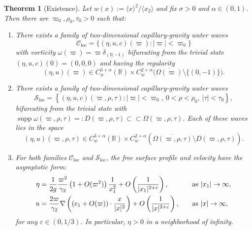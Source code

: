 \documentclass[11pt,reqno]{amsart}
\newcommand{\jbracket}[1]{\langle{#1}\rangle}
\newcommand{\supp}[1]{\operatorname{supp}{#1}}
\newcommand{\R}{\mathbb{R}}
\newcommand{\abs}[2][]{#1\lvert #2 #1\rvert}
\theoremstyle{plain}
\newtheorem{theorem}{Theorem}[section]
\theoremstyle{remark}
\numberwithin{equation}{section}
\begin{document}
\begin{theorem}[Existence] \label{existence theorem}  
  Let $w(x) := \jbracket{x}^2/\jbracket{x_2}$ and fix $\sigma > 0$ and $\alpha \in (0,1)$. Then there are $\varpi_0,\rho_0,\tau_0 > 0$ such that:
  \begin{enumerate}[label=\rm(\alph*)]
  \item There exists a family of two-dimensional capillary-gravity water waves 
  \[ 
  \mathscr{C}_{\mathrm{loc}}= \{ (\eta,u,c)(\varpi) : | \varpi | < \varpi_0 \} 
  \]
  with vorticity $\omega(\varpi) = \varpi \delta_{(0,-1)}$ bifurcating from the trivial state $(\eta,u,c)(0) = (0,0,0)$ and having the regularity
  \[ (\eta, u)(\varpi) \in C_w^{3+\alpha}(\R) \times C_w^{2+\alpha}\big(\overline{\Omega(\varpi)}\setminus \{(0,-1)\}\big).\]

\item There exists a family of two-dimensional capillary-gravity water waves
  \[ 
  \mathscr{S}_{\mathrm{loc}} = \left\{ (\eta, u,c)(\varpi,\rho,\tau) : |\varpi| < \varpi_0, ~ 0 < \rho <  \rho_0, ~ |\tau| < \tau_0 \right\},
  \]
  bifurcating from the trivial state
   with 
  $\supp{\omega(\varpi,\rho,\tau)} =: D(\varpi,\rho,\tau) \subset\subset \Omega(\varpi,\rho,\tau)$. Each of these waves lies in the space 
  \[ 
  (\eta,u)(\varpi,\rho,\tau)  \in C_w^{3+\alpha}(\R) \times C_w^{2+\alpha}(\overline{\Omega(\varpi,\rho,\tau)} \setminus D(\varpi,\rho,\tau)).
  \]

\item For both families $\mathscr{C}_{\mathrm{loc}}$ and $\mathscr{S}_{\mathrm{loc}}$, the free surface profile and velocity have the asymptotic form:
  \begin{equation}
    \begin{alignedat} {2}
      \eta & = 
      \frac{1}{2g} \frac{\varpi^2}{\gamma_2}
      \left( 1 +  O(\varpi^2) \right)  \frac{1}{x_1^2} 
      + O\left( \frac 1{\abs{x_1}^{2+\varepsilon}} \right),
      &\qquad& \textup{as } |x_1| \to \infty, \\
      u & = \frac{2\varpi}{\gamma_2}
      \nabla \left( \left( e_1 + O(\varpi) \right) \cdot \frac x{\abs x^2} \right)
       + O\left(\frac 1{|x|^{2+\varepsilon}} \right), 
      && \textup{as } |x| \to \infty, 
    \end{alignedat} \label{SWZ asymptotics} 
  \end{equation}
  for any $\varepsilon \in (0,1/3)$.  In particular, $\eta > 0$ in a neighborhood of infinity.    
  \end{enumerate}
\end{theorem}
\end{document}
